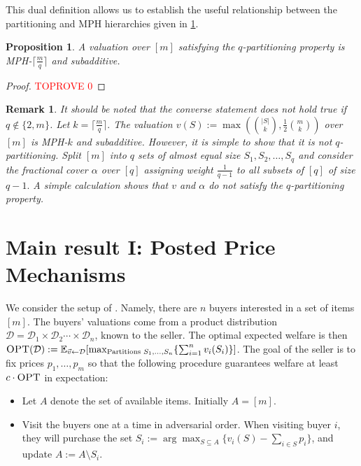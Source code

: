 \documentclass[11pt]{article}%
\newtheorem{remark}[theorem]{Remark}
\newtheorem{proposition}[theorem]{Proposition}
\numberwithin{theorem}{subsection}
\begin{document}
\noindent
This dual definition allows us to establish the useful relationship between the partitioning and MPH hierarchies given in \cref{lem:qpartandmphk}.


\begin{proposition}
\label{lem:qpartandmphk}
A valuation over $[m]$ satisfying the $q$-partitioning property is MPH-$\lceil \frac{m}{q}\rceil$ and subadditive.\end{proposition}

\begin{proof}\textcolor{red}{TOPROVE 0}\end{proof}

\begin{remark}
\normalfont
It should be noted that the converse statement does not hold true if $q\not \in \{2,m\}$. Let $k = \lceil \frac{m}{q}\rceil.$ The valuation $v(S):= \max\left( \binom{|S|}{k}, \frac{1}{2}\binom{m}{k}\right)$ over $[m]$ is MPH-$k$ and subadditive. However, it is simple to show that it is not $q$-partitioning. Split $[m]$ into $q$ sets of almost equal size $S_1, S_2, \ldots, S_q$ and consider the fractional cover $\alpha$ over $[q]$ assigning weight $\frac{1}{q-1}$ to all subsets of $[q]$ of size $q-1.$ A simple calculation shows that $v$ and $\alpha$ do not satisfy the $q$-partitioning property.
\end{remark}

\section{Main result I: Posted Price Mechanisms}\label{section:postedprices}
We consider the setup of \cite{FeldmanGL15}. Namely, there are $n$ buyers interested in a set of items $[m].$ The buyers' valuations come from a product distribution $\mathcal{D} = \mathcal{D}_1\times \mathcal{D}_2\cdots\times\mathcal{D}_n$, known to the seller. The optimal expected welfare is then $\textsc{OPT}(\mathcal{D}):=\mathbb{E}_{\vec{v} \leftarrow \mathcal{D}}[\max_{\text{Partitions } S_1,\ldots, S_n}\{\sum_{i=1}^n v_i(S_i)\}]$. The goal of the seller is to fix prices $p_1,\ldots, p_m$ so that the following procedure guarantees welfare at least $c\cdot \textsc{OPT}$ in expectation:
\begin{itemize}
\item Let $A$ denote the set of available items. Initially $A = [m]$.
\item Visit the buyers one at a time in adversarial order. When visiting buyer $i$, they will purchase the set $S_i:=\arg\max_{S \subseteq A}\{v_i(S) - \sum_{i \in S} p_i\}$, and update $A:=A \setminus S_i$. 
\end{itemize}
\end{document}
